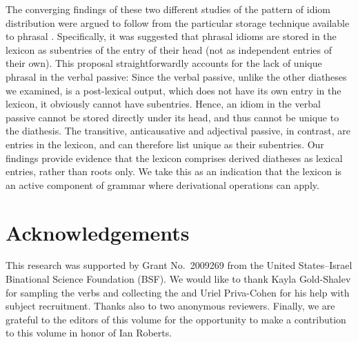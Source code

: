 \documentclass[output=paper]{langsci/langscibook}
\begin{document}
The converging findings of these two different studies of the pattern of idiom
distribution were argued to follow from the particular storage technique
available to phrasal . Specifically, it was suggested that phrasal idioms
are stored in the lexicon as subentries of the entry of their head (not as
independent entries of their own). This proposal straightforwardly accounts for
the lack of unique phrasal  in the verbal passive: Since the verbal
passive, unlike the other diatheses we examined, is a post-lexical output,
which does not have its own entry in the lexicon, it obviously cannot have
subentries. Hence, an idiom in the verbal passive cannot be stored directly
under its head, and thus cannot be unique to the diathesis. The transitive,
anticausative and adjectival passive, in contrast, are entries in the lexicon,
and can therefore list unique  as their subentries. Our findings provide
evidence that the lexicon comprises derived diatheses as lexical entries,
rather than roots only. We take this as an indication that the lexicon is an
active component of grammar where derivational operations can apply.

\printchapterglossary{}

\section*{Acknowledgements}

This research was supported by Grant No.\ 2009269 from the United States–Israel
Binational Science Foundation (BSF). We would like to thank Kayla Gold-Shalev
for sampling the verbs and collecting the  and Uriel Priva-Cohen for his
help with subject recruitment. Thanks also to two anonymous reviewers. Finally,
we are grateful to the editors of this volume for the opportunity to make a
contribution to this volume in honor of Ian Roberts.

{\sloppy
\printbibliography[heading=subbibliography,notkeyword=this]
}
\end{document}
